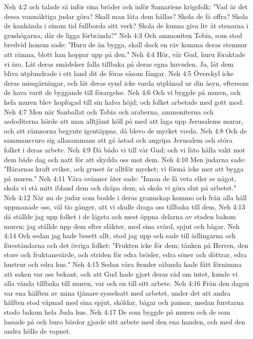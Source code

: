 Neh 4:2  och talade så inför sina bröder och inför Samariens krigsfolk: "Vad är det dessa vanmäktiga judar göra? Skall man låta dem hållas? Skola de få offra? Skola de kanhända i sinom tid fullborda sitt verk? Skola de kunna giva liv åt stenarna i grushögarna, där de ligga förbrända?"
Neh 4:3  Och ammoniten Tobia, som stod bredvid honom sade: "Huru de än bygga, skall dock en räv komma deras stenmur att rämna, blott han hoppar upp på den."
Neh 4:4  Hör, vår Gud, huru föraktade vi äro. Låt deras smädelser falla tillbaka på deras egna huvuden. Ja, låt dem bliva utplundrade i ett land dit de föras såsom fångar.
Neh 4:5  Överskyl icke deras missgärningar, och låt deras synd icke varda utplånad ur din åsyn, eftersom de hava varit de byggande till förargelse.
Neh 4:6  Och vi byggde på muren, och hela muren blev hopfogad till sin halva höjd; och folket arbetade med gott mod.
Neh 4:7  Men när Sanballat och Tobia och araberna, ammoniterna och asdoditerna hörde att man alltjämt höll på med att laga upp Jerusalems murar, och att rämnorna begynte igentäppas, då blevo de mycket vreda.
Neh 4:8  Och de sammansvuro sig allasammans att gå åstad och angripa Jerusalem och störa folket i deras arbete.
Neh 4:9  Då bådo vi till vår Gud; och vi läto hålla vakt mot dem både dag och natt för att skydda oss mot dem.
Neh 4:10  Men judarna sade: "Bärarnas kraft sviker, och gruset är alltför mycket; vi förmå icke mer att bygga på muren."
Neh 4:11  Våra ovänner åter sade: "Innan de få veta eller se något, skola vi stå mitt ibland dem och dräpa dem; så skola vi göra slut på arbetet."
Neh 4:12  När nu de judar som bodde i deras grannskap kommo och från alla håll uppmanade oss, väl tio gånger, att vi skulle draga oss tillbaka till dem,
Neh 4:13  då ställde jag upp folket i de lägsta och mest öppna delarna av staden bakom muren; jag ställde upp dem efter släkter, med sina svärd, spjut och bågar.
Neh 4:14  Och sedan jag hade besett allt, stod jag upp och sade till ädlingarna och föreståndarna och det övriga folket: "Frukten icke för dem; tänken på Herren, den store och fruktansvärde, och striden för edra bröder, edra söner och döttrar, edra hustrur och edra hus."
Neh 4:15  Sedan våra fiender sålunda hade fått förnimma att saken var oss bekant, och att Gud hade gjort deras råd om intet, kunde vi alla vända tillbaka till muren, var och en till sitt arbete.
Neh 4:16  Från den dagen var ena hälften av mina tjänare sysselsatt med arbetet, under det att andra hälften stod väpnad med sina spjut, sköldar, bågar och pansar, medan furstarna stodo bakom hela Juda hus.
Neh 4:17  De som byggde på muren och de som lassade på och buro bördor gjorde sitt arbete med den ena handen, och med den andra höllo de vapnet.
